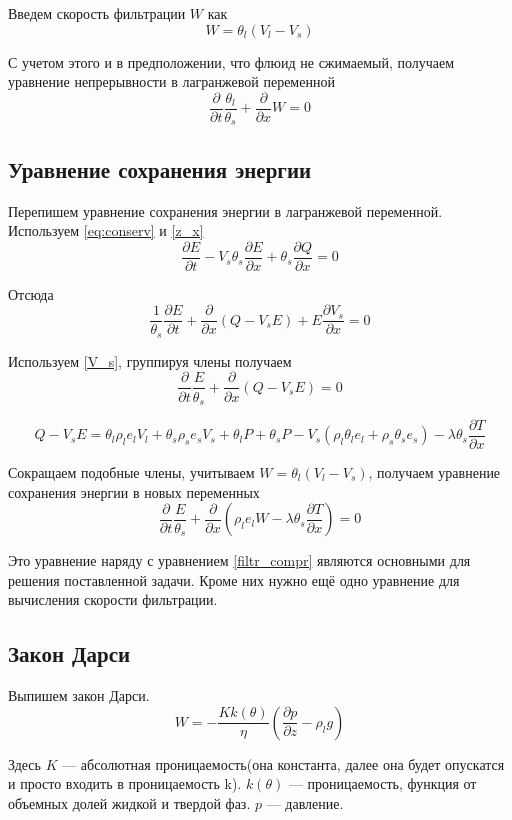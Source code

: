 \documentclass[12pt,a4paper]{article}
\newcommand{\pd}[2]{\frac{\partial #1}{\partial #2}}
\begin{document}
Введем скорость фильтрации $W$ как
\begin{equation}
W = \theta_l (V_l - V_s )
\label{W_filtr}
\end{equation}

С учетом этого и в предположении, что флюид не сжимаемый, получаем уравнение непрерывности в лагранжевой переменной
\begin{equation}
\pd{}{t}\frac{\theta_l}{\theta_s} + \pd{}{x}W = 0
\label{filtr_compr}
\end{equation}
\subsection{Уравнение сохранения энергии}
Перепишем уравнение сохранения энергии в лагранжевой переменной. Используем \eqref{eq:conserv} и \eqref{z_x}
$$
\pd{E}{t} - V_s\theta_s\pd{E}{x} + \theta_s\pd{Q}{x} = 0
$$

Отсюда
$$
\frac{1}{\theta_s}\pd{E}{t} + \pd{}{x}(Q-V_s E) + E\pd{V_s}{x} = 0
$$

Используем \eqref{V_s}, группируя члены получаем
\begin{equation}
\pd{}{t}\frac{E}{\theta_s} + \pd{}{x}(Q - V_s E) = 0
\end{equation}

$$
Q-V_s E = \theta_l\rho_l e_l V_l + \theta_s\rho_s e_s V_s + \theta_l P + \theta_s P -V_s(\rho_l\theta_l e_l +\rho_s\theta_s e_s) - \lambda\theta_s\pd{T}{x}
$$

Сокращаем подобные члены, учитываем $W = \theta_l (V_l - V_s )$, получаем уравнение сохранения энергии в новых переменных
\begin{equation}
\pd{}{t}\frac{E}{\theta_s} + \pd{}{x}(\rho_l e_l W - \lambda\theta_s\pd{T}{x}) = 0
\label{eq:conserv_new}
\end{equation}

Это уравнение наряду с уравнением \eqref{filtr_compr} являются основными для решения поставленной задачи. Кроме них нужно ещё одно уравнение для вычисления скорости фильтрации. 
\subsection{Закон Дарси}
Выпишем закон Дарси.
\begin{equation}
W= -\frac{K k(\theta)}{\eta}\left(\pd{p}{z} - \rho_l g \right)
\label{Darsi}
\end{equation}

Здесь $ K $ --- абсолютная проницаемость(она константа, далее она будет опускатся и просто входить в проницаемость k). $k(\theta)$ --- проницаемость, функция от объемных долей жидкой и твердой фаз. $p$ --- давление. 
\end{document}
